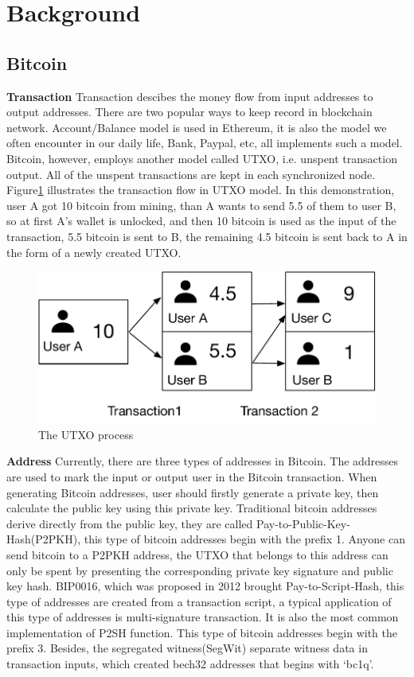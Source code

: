 \section{Background}
\label{sec:background}
\subsection{Bitcoin}

\textbf{Transaction} Transaction descibes the money flow from input addresses to output addresses. There are two popular ways to keep record in blockchain network. Account/Balance model is used in Ethereum, it is also the model we often encounter in our daily life, Bank, Paypal, etc, all implements such a model. Bitcoin, however, employs another model called UTXO, i.e. unspent transaction output. All of the unspent transactions are kept in each synchronized node. Figure\ref{fig:UTXO} illustrates the transaction flow in UTXO model. In this demonstration, user A got 10 bitcoin from mining, than A wants to send 5.5 of them to user B, so at first A's wallet is unlocked, and then 10 bitcoin is used as the input of the transaction, 5.5 bitcoin is sent to B, the remaining 4.5 bitcoin is sent back to A in the form of a newly created UTXO.
\begin{figure}[tbp]
\centerline{\includegraphics[width=0.8\columnwidth]{images/UTXO.pdf}}
\caption{The UTXO process}
\label{fig:UTXO}
\end{figure}

\textbf{Address}
Currently, there are three types of addresses in Bitcoin. The addresses are used to mark the input or output user in the Bitcoin transaction. When generating Bitcoin addresses, user should firstly generate a private key, then calculate the public key using this private key. Traditional bitcoin addresses derive directly from the public key, they are called Pay-to-Public-Key-Hash(P2PKH), this type of bitcoin addresses begin with the prefix 1. Anyone can send bitcoin to a P2PKH address, the UTXO that belongs to this address can only be spent by presenting the corresponding private key signature and public key hash. BIP0016\cite{BIP0016}, which was proposed in 2012 brought Pay-to-Script-Hash, this type of addresses are created from a transaction script, a typical application of this type of addresses is multi-signature transaction. It is also the most common implementation of P2SH function. This type of bitcoin addresses begin with the prefix 3. Besides, the segregated witness(SegWit) separate witness data in transaction inputs, which created bech32 addresses that begins with `bc1q'.

